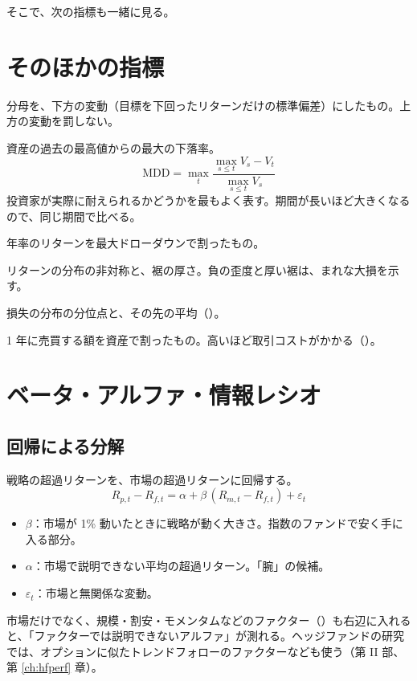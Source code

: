 そこで、次の指標も一緒に見る。

\section{そのほかの指標}

\begin{description}[leftmargin=1.5em,style=nextline]
\item[ソルティノ・レシオ]
  分母を、下方の変動（目標を下回ったリターンだけの標準偏差）にしたもの。上方の変動を罰しない。
\item[最大ドローダウン]
  資産の過去の最高値からの最大の下落率。
  \begin{equation}
  \mathrm{MDD} = \max_t \frac{\max_{s \le t} V_s - V_t}{\max_{s \le t} V_s}
  \end{equation}
  投資家が実際に耐えられるかどうかを最もよく表す。期間が長いほど大きくなるので、同じ期間で比べる。
\item[カルマー・レシオ]
  年率のリターンを最大ドローダウンで割ったもの。
\item[歪度と尖度]
  リターンの分布の非対称と、裾の厚さ。負の歪度と厚い裾は、まれな大損を示す。
\item[VaR と期待ショートフォール]
  損失の分布の分位点と、その先の平均（）。
\item[回転率]
  1 年に売買する額を資産で割ったもの。高いほど取引コストがかかる（）。
\end{description}

\section{ベータ・アルファ・情報レシオ}

\subsection{回帰による分解}

戦略の超過リターンを、市場の超過リターンに回帰する。
\begin{equation}
R_{p,t} - R_{f,t} = \alpha + \beta\,(R_{m,t} - R_{f,t}) + \varepsilon_t
\end{equation}
\begin{itemize}
\item $\beta$：市場が 1\% 動いたときに戦略が動く大きさ。指数のファンドで安く手に入る部分。
\item $\alpha$：市場で説明できない平均の超過リターン。「腕」の候補。
\item $\varepsilon_t$：市場と無関係な変動。
\end{itemize}
市場だけでなく、規模・割安・モメンタムなどのファクター（）も右辺に入れると、「ファクターでは説明できないアルファ」が測れる。ヘッジファンドの研究では、オプションに似たトレンドフォローのファクターなども使う（第 II 部、第 \ref{ch:hfperf} 章）。

